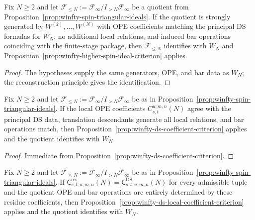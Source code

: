 \begin{proposition}
\label{prop:winfty-ds-coefficient-criterion}
Fix $N \ge 2$ and let
$\mathcal{F}_{\le N}:=\mathcal{F}_\infty/I_{>N}\mathcal{F}_\infty$
be a quotient from
Proposition~\ref{prop:winfty-spin-triangular-ideals}.
If the quotient is strongly generated by $W^{(2)},\dots,W^{(N)}$ with
OPE coefficients matching the principal DS formulas for $W_N$, no
additional local relations, and induced bar operations coinciding with
the finite-stage package, then $\mathcal{F}_{\le N}$ identifies with
$W_N$ and
Proposition~\ref{prop:winfty-higher-spin-ideal-criterion} applies.
\end{proposition}

\begin{proof}
The hypotheses supply the same generators, OPE, and bar data as $W_N$; the reconstruction principle gives the identification.
\end{proof}

\begin{proposition}
\label{prop:winfty-ds-local-coefficient-criterion}
Fix $N \ge 2$ and let
$\mathcal{F}_{\le N}:=\mathcal{F}_\infty/I_{>N}\mathcal{F}_\infty$
be as in
Proposition~\ref{prop:winfty-spin-triangular-ideals}.  If the local
OPE coefficients $C_{s,t}^{u;m,n}(N)$ agree with the principal DS data,
translation descendants generate all local relations, and bar operations
match, then Proposition~\ref{prop:winfty-ds-coefficient-criterion}
applies and the quotient identifies with $W_N$.
\end{proposition}

\begin{proof}
Immediate from Proposition~\ref{prop:winfty-ds-coefficient-criterion}.
\end{proof}

\begin{proposition}
\label{prop:winfty-ds-residue-identity-criterion}
Fix $N \ge 2$ and let
$\mathcal{F}_{\le N}:=\mathcal{F}_\infty/I_{>N}\mathcal{F}_\infty$
be as in Proposition~\ref{prop:winfty-spin-triangular-ideals}.
If $\mathsf{C}^{\mathrm{res}}_{s,t;u;m,n}(N)
= \mathsf{C}^{\mathrm{DS}}_{s,t;u;m,n}(N)$
for every admissible tuple and the quotient OPE and bar operations are
entirely determined by these residue coefficients, then
Proposition~\ref{prop:winfty-ds-local-coefficient-criterion} applies
and the quotient identifies with $W_N$.
\end{proposition}

